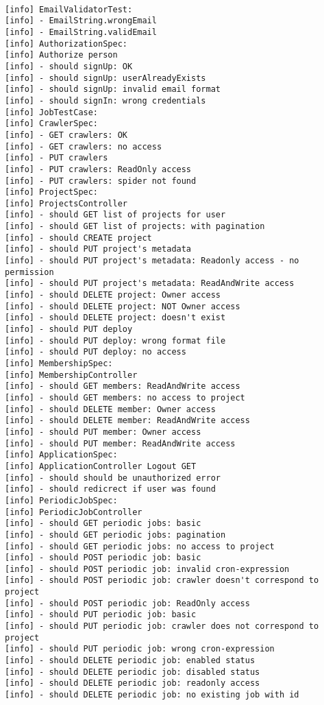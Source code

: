 	\begin{lstlisting}[frame=single, basicstyle=\footnotesize\ttfamily, label={lst:tests}, caption={Результаты тестирования в консоли},captionpos=b]

[info] EmailValidatorTest:
[info] - EmailString.wrongEmail
[info] - EmailString.validEmail
[info] AuthorizationSpec:
[info] Authorize person
[info] - should signUp: OK
[info] - should signUp: userAlreadyExists
[info] - should signUp: invalid email format
[info] - should signIn: wrong credentials
[info] JobTestCase:
[info] CrawlerSpec:
[info] - GET crawlers: OK
[info] - GET crawlers: no access
[info] - PUT crawlers
[info] - PUT crawlers: ReadOnly access
[info] - PUT crawlers: spider not found
[info] ProjectSpec:
[info] ProjectsController
[info] - should GET list of projects for user
[info] - should GET list of projects: with pagination
[info] - should CREATE project
[info] - should PUT project's metadata
[info] - should PUT project's metadata: Readonly access - no permission
[info] - should PUT project's metadata: ReadAndWrite access
[info] - should DELETE project: Owner access
[info] - should DELETE project: NOT Owner access
[info] - should DELETE project: doesn't exist
[info] - should PUT deploy
[info] - should PUT deploy: wrong format file
[info] - should PUT deploy: no access
[info] MembershipSpec:
[info] MembershipController
[info] - should GET members: ReadAndWrite access
[info] - should GET members: no access to project
[info] - should DELETE member: Owner access
[info] - should DELETE member: ReadAndWrite access
[info] - should PUT member: Owner access
[info] - should PUT member: ReadAndWrite access
[info] ApplicationSpec:
[info] ApplicationController Logout GET
[info] - should should be unauthorized error
[info] - should redicrect if user was found
[info] PeriodicJobSpec:
[info] PeriodicJobController
[info] - should GET periodic jobs: basic
[info] - should GET periodic jobs: pagination
[info] - should GET periodic jobs: no access to project
[info] - should POST periodic job: basic
[info] - should POST periodic job: invalid cron-expression
[info] - should POST periodic job: crawler doesn't correspond to project
[info] - should POST periodic job: ReadOnly access
[info] - should PUT periodic job: basic
[info] - should PUT periodic job: crawler does not correspond to project
[info] - should PUT periodic job: wrong cron-expression
[info] - should DELETE periodic job: enabled status
[info] - should DELETE periodic job: disabled status
[info] - should DELETE periodic job: readonly access
[info] - should DELETE periodic job: no existing job with id

\end{lstlisting}
